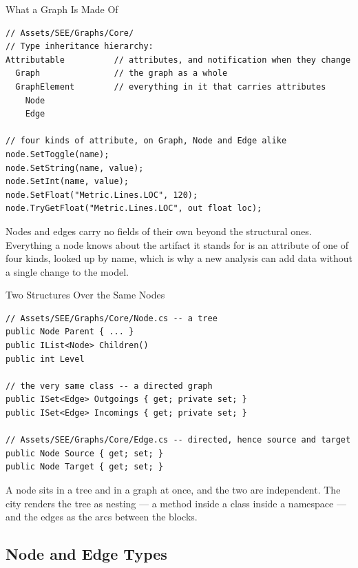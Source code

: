 \begin{frame}[fragile]{What a Graph Is Made Of}
  \begin{lstlisting}[basicstyle=\scriptsize\ttfamily]
// Assets/SEE/Graphs/Core/
// Type inheritance hierarchy:
Attributable          // attributes, and notification when they change
  Graph               // the graph as a whole
  GraphElement        // everything in it that carries attributes
    Node
    Edge

// four kinds of attribute, on Graph, Node and Edge alike
node.SetToggle(name);
node.SetString(name, value);
node.SetInt(name, value);
node.SetFloat("Metric.Lines.LOC", 120);
node.TryGetFloat("Metric.Lines.LOC", out float loc);
  \end{lstlisting}
  \vspace{1ex}

  Nodes and edges carry no fields of their own beyond the structural ones.
  Everything a node knows about the artifact it stands for is an attribute of
  one of four kinds, looked up by name, which is why a new analysis can add
  data without a single change to the model.
\end{frame}

\begin{frame}[fragile]{Two Structures Over the Same Nodes}
  \begin{lstlisting}[basicstyle=\scriptsize\ttfamily]
// Assets/SEE/Graphs/Core/Node.cs -- a tree
public Node Parent { ... }
public IList<Node> Children()
public int Level

// the very same class -- a directed graph
public ISet<Edge> Outgoings { get; private set; }
public ISet<Edge> Incomings { get; private set; }

// Assets/SEE/Graphs/Core/Edge.cs -- directed, hence source and target
public Node Source { get; set; }
public Node Target { get; set; }
  \end{lstlisting}
  \vspace{1ex}

  A node sits in a tree and in a graph at once, and the two are independent.
  The city renders the tree as nesting --- a method inside a class inside a namespace
  --- and the edges as the arcs between the blocks.
\end{frame}

\subsection{Node and Edge Types}

